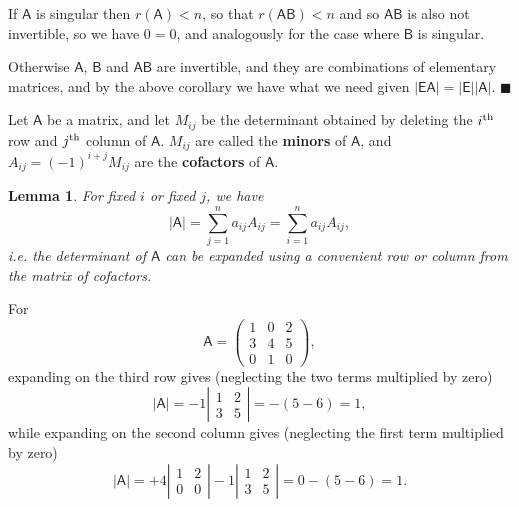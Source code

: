 \documentclass[letter-paper]{tufte-book}
\newtheorem{lemma}[theorem]{\color{pastel-blue}Lemma}
\newenvironment{proof}[1][Proof]{\begin{trivlist}
\item[\hskip \labelsep {\bfseries #1}]}{\end{trivlist}}
\newenvironment{example}[1][Example]{\begin{trivlist}
\item[\hskip \labelsep {\bfseries #1}]}{\end{trivlist}}
\newcommand{\As}{{\mathsf{A}}}
\newcommand{\Bs}{{\mathsf{B}}}
\newcommand{\qed}{\hfill$\blacksquare$}
\begin{document}
\begin{proof}
  If $\As$ is singular then $r(\As) < n$, so that $r(\As \Bs) < n$ and so $\As \Bs$ is also not invertible, so we have $0=0$, and analogously for the case where $\Bs$ is singular.
  
  Otherwise $\As$, $\Bs$ and $\As \Bs$ are invertible, and they are combinations of elementary matrices, and by the above corollary we have what we need given $|\mathsf{E}\As| = |\mathsf{E}| |\As|$. \qed
\end{proof}

Let $\As$ be a matrix, and let $M_{ij}$ be the determinant obtained by deleting the $i^{\tiny\textnormal{th}}$ row and $j^{\tiny\textnormal{th}}$ column of $\As$. $M_{ij}$ are called the \textbf{minors} of $\As$, and $A_{ij} = (-1)^{i+j}M_{ij}$ are the \textbf{cofactors} of $\As$.

\begin{lemma}
  For fixed $i$ or fixed $j$, we have
  \begin{equation*}
    |\As| = \sum_{j=1}^n a_{ij} A_{ij} = \sum_{i=1}^n a_{ij}A_{ij},
  \end{equation*}
  i.e. the determinant of $\As$ can be expanded using a convenient row or column from the matrix of cofactors.
\end{lemma}

\begin{example}
  For
  \begin{equation*}
    \As = \begin{pmatrix}
      1 & 0 & 2 \\
      3 & 4 & 5 \\
      0 & 1 & 0
    \end{pmatrix},
  \end{equation*}
  expanding on the third row gives (neglecting the two terms multiplied by zero)
  \begin{equation*}
    |\As| = -1\left|\begin{matrix}1 & 2 \\ 3 & 5 \end{matrix}\right| = -(5-6) = 1,
  \end{equation*}
  while expanding on the second column gives (neglecting the first term multiplied by zero)
  \begin{equation*}
    |\As| = +4\left|\begin{matrix}1 & 2 \\ 0 & 0 \end{matrix}\right| - 1\left|\begin{matrix}1 & 2 \\ 3 & 5 \end{matrix}\right| = 0 - (5-6) = 1.
  \end{equation*}
\end{example}
\end{document}
